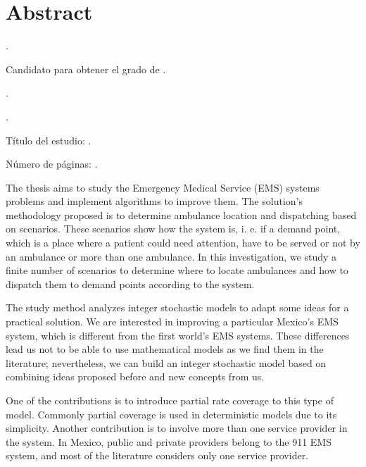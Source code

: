 
\chapter{Abstract}

{\setlength{\leftskip}{10mm}
\setlength{\parindent}{-10mm}

\autor.

Candidato para obtener el grado de \grado\orientacion.

\uanl.

\fime.

Título del estudio: \textsc{\titulo}.

\noindent Número de páginas: \pageref*{lastpage}.}




The thesis aims to study the Emergency Medical Service (EMS) systems pro\-blems and implement algorithms to improve them. The solution's methodology proposed is to determine ambulance location and dispatching based on scenarios. These scenarios show how the system is, i. e. if a demand point, which is a place where a patient could need attention, have to be served or not by an ambulance or more than one ambulance. In this investigation, we study a finite number of scenarios to determine where to locate ambulances and how to dispatch them to demand points according to the system.

The study method analyzes integer stochastic models to adapt some ideas for a practical solution. We are interested in improving a particular Mexico's EMS system, which is different from the first world's EMS systems. These differences lead us not to be able to use mathematical models as we find them in the literature; nevertheless, we can build an integer stochastic model based on combining ideas proposed before and new concepts from us. 

One of the contributions is to introduce partial rate coverage to this type of model. Commonly partial coverage is used in deterministic models due to its simplicity. Another contribution is to involve more than one service provider in the system. In Mexico, public and private providers belong to the 911 EMS system, and most of the literature considers only one service provider.

